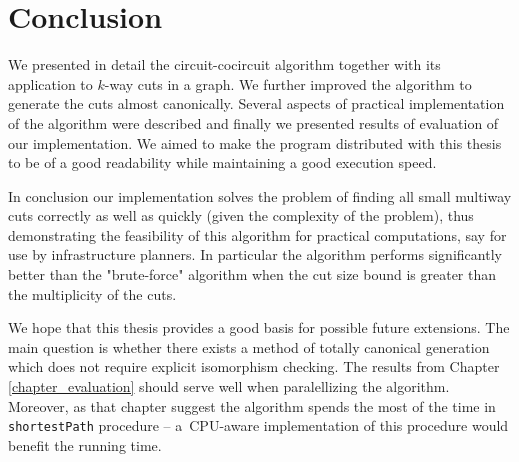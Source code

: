 
\chapter{Conclusion}

We presented in detail the circuit-cocircuit algorithm together with its application to $k$-way cuts in a graph. We further improved the algorithm to generate the cuts almost canonically. Several aspects of practical implementation of the algorithm were described and finally we presented results of evaluation of our implementation. We aimed to make the program distributed with this thesis to be of a good readability while maintaining a good execution speed.

In conclusion our implementation solves the problem of finding all small multiway cuts correctly as well as quickly (given the complexity of the problem), thus demonstrating the feasibility of this algorithm for practical computations, say for use by infrastructure planners. In particular the algorithm performs significantly better than the "brute-force" algorithm when the cut size bound is greater than the multiplicity of the cuts.

We hope that this thesis provides a good basis for possible future extensions. The main question is whether there exists a method of totally canonical generation which does not require explicit isomorphism checking. The results from Chapter \ref{chapter_evaluation} should serve well when paralellizing the algorithm. Moreover, as that chapter suggest the algorithm spends the most of the time in \lstinline|shortestPath| procedure -- a~CPU-aware implementation \cite{parallel_bfs} of this procedure would benefit the running time.
